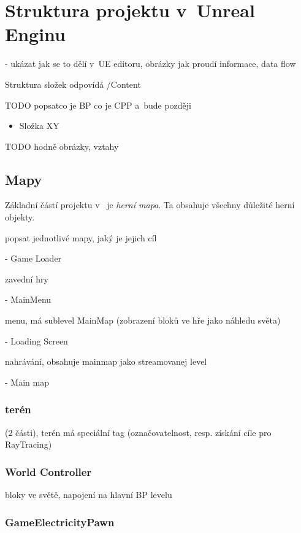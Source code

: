 
\section{Struktura projektu v~Unreal Enginu}
\label{sec:ueStructure}

- ukázat jak se to dělí v~UE editoru, obrázky jak proudí informace, data flow

Struktura složek odpovídá /Content 

TODO  popsatco je BP co je CPP a~bude později 

\begin{itemize}
	\item Složka XY
\end{itemize}


TODO hodně obrázky, vztahy

\subsection{Mapy}

Základní částí projektu v~ je \textit{herní mapa}. Ta obsahuje všechny důležité herní objekty.

popsat jednotlivé mapy, jaký je jejich cíl

- Game Loader

zavední hry

- MainMenu

menu, má sublevel MainMap (zobrazení bloků ve hře jako náhledu světa)

- Loading Screen

nahrávání, obsahuje mainmap jako streamovanej level

- Main map

\subsubsection{terén}

 (2 části), terén má speciální tag (označovatelnost, resp. získání cíle pro RayTracing)

\subsubsection{World Controller}

bloky ve světě, napojení na hlavní BP levelu

\subsubsection{GameElectricityPawn}

